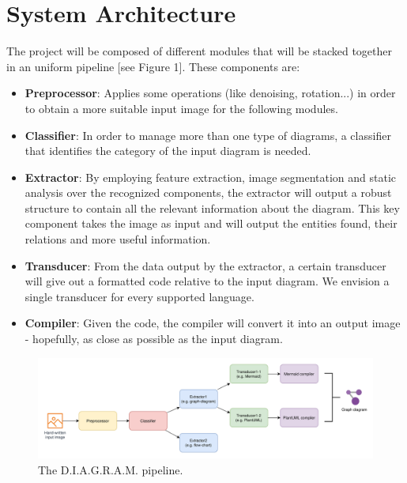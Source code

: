 \documentclass[a4paper,12pt]{article}
\begin{document}
\section{System Architecture}
    The project will be composed of different modules that will be stacked together in an uniform pipeline [see Figure 1]. These components are:
    \begin{itemize}
    		\item \textbf{Preprocessor}: Applies some operations (like denoising, rotation...) in order to obtain a more suitable input image for the following modules.
    		\item \textbf{Classifier}: In order to manage more than one type of diagrams, a classifier that identifies the category of the input diagram is needed.
    		\item \textbf{Extractor}: By employing feature extraction, image segmentation and static analysis over the recognized components, the extractor will output a robust structure to contain all the relevant information about the diagram. This key component takes the image as input and will output the entities found, their relations and more useful information.
    		\item \textbf{Transducer}: From the data output by the extractor, a certain transducer will give out a formatted code relative to the input diagram. We envision a single transducer for every supported language.
    		\item \textbf{Compiler}: Given the code, the compiler will convert it into an output image - hopefully, as close as possible as the input diagram.
    \end{itemize}

\begin{figure}[h]
    \centering
    \includegraphics[width=1.2\textwidth]{../assets/images/overview.png} %
    \caption{The D.I.A.G.R.A.M. pipeline.}
\end{figure}
\end{document}
